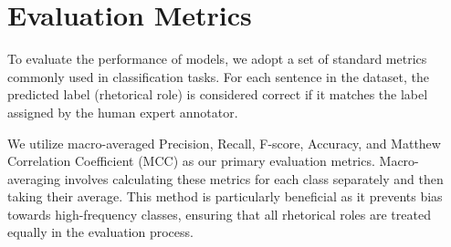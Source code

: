\section{Evaluation Metrics}
To evaluate the performance of models, we adopt a set of standard metrics commonly used in classification tasks. For each sentence in the dataset, the predicted label (rhetorical role) is considered correct if it matches the label assigned by the human expert annotator.

We utilize macro-averaged Precision, Recall, F-score, Accuracy, and Matthew Correlation Coefficient (MCC) \citet{chicco2020advantages} as our primary evaluation metrics. Macro-averaging involves calculating these metrics for each class separately and then taking their average. This method is particularly beneficial as it prevents bias towards high-frequency classes, ensuring that all rhetorical roles are treated equally in the evaluation process.